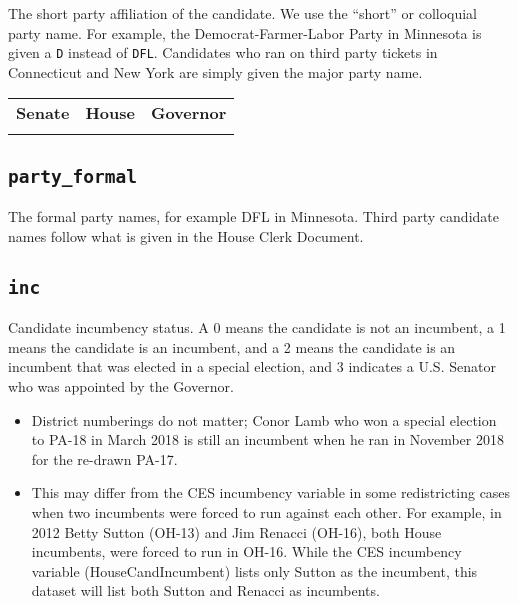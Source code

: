 \documentclass[12pt]{article}
\begin{document}
The short party affiliation of the candidate. We use the ``short'' or colloquial party name. For example, the Democrat-Farmer-Labor Party in Minnesota is given a \texttt{D} instead of \texttt{DFL}. Candidates who ran on third party tickets in Connecticut and New York are simply given the major party name.   
\begin{table}[!h]
\begin{adjustwidth}{-4em}{-4em}
\centering
\begin{tabularx}{\linewidth}{CCC}
\textbf{Senate} & \textbf{House} & \textbf{Governor}\\
   &  &
\end{tabularx}
\end{adjustwidth}
\end{table}


\FloatBarrier 

\subsection*{\texttt{party\_formal}}
The formal party names, for example DFL in Minnesota. Third party candidate names follow what is given in the House Clerk Document. 

\twocolumn
\begin{adjustwidth}{-2em}{-2em}
\centering
{\scriptsize

}
\end{adjustwidth}

\onecolumn



\subsection*{\texttt{inc}}

Candidate incumbency status. A 0 means the candidate is not an incumbent, a 1 means the candidate is an incumbent, and a 2 means the candidate is an incumbent that was elected in a special election, and 3 indicates a U.S. Senator who was appointed by the Governor.
\begin{itemize}
\item District numberings do not matter; Conor Lamb who won a special election to PA-18 in March 2018 is still an incumbent when he ran in November 2018 for the re-drawn PA-17.
\item This may differ from the CES incumbency variable in some redistricting cases when two incumbents were forced to run against each other. For example, in 2012 Betty Sutton (OH-13) and Jim Renacci (OH-16), both House incumbents, were forced to run in OH-16. While the CES incumbency variable (HouseCandIncumbent) lists only Sutton as the incumbent, this dataset will list both Sutton and Renacci as incumbents. 

\end{itemize}
\end{document}
